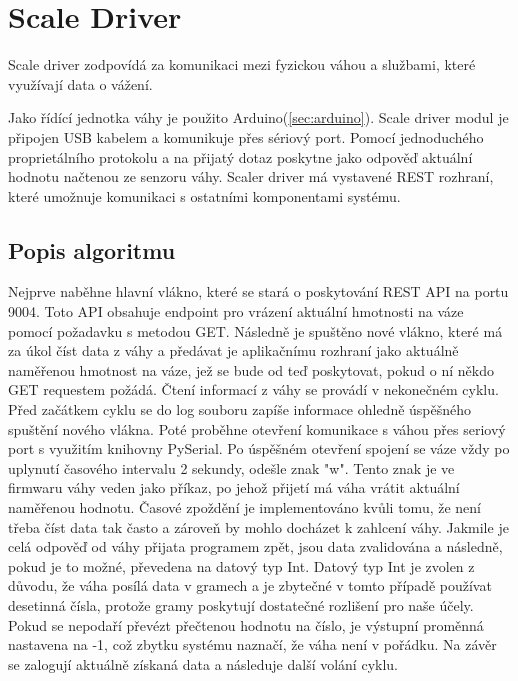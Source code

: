 \section{Scale Driver}\label{sec:scale-driver}
Scale driver zodpovídá za komunikaci mezi fyzickou váhou a službami, které využívají data o vážení.\newline

Jako řídící jednotka váhy je použito Arduino(\ref{sec:arduino}).
Scale driver modul je připojen USB kabelem a komunikuje přes sériový port.
Pomocí jednoduchého proprietálního protokolu a na přijatý dotaz poskytne jako odpověď aktuální hodnotu načtenou ze senzoru váhy.
Scaler driver má vystavené REST rozhraní, které umožnuje komunikaci s ostatními komponentami systému.

\subsection*{Popis algoritmu}
Nejprve naběhne hlavní vlákno, které se stará o poskytování REST API na portu 9004.
Toto API obsahuje endpoint pro vrázení aktuální hmotnosti na váze pomocí požadavku s metodou GET.
Následně je spuštěno nové vlákno, které má za úkol číst data z váhy a předávat je aplikačnímu rozhraní jako aktuálně naměřenou hmotnost na váze, jež se bude od teď poskytovat, pokud o ní někdo GET requestem požádá.
Čtení informací z váhy se provádí v nekonečném cyklu.
Před začátkem cyklu se do log souboru zapíše informace ohledně úspěšného spuštění nového vlákna.
Poté proběhne otevření komunikace s váhou přes seriový port s využitím knihovny PySerial.
Po úspěšném otevření spojení se váze vždy po uplynutí časového intervalu 2 sekundy, odešle znak "w".
Tento znak je ve firmwaru váhy veden jako příkaz, po jehož přijetí má váha vrátit aktuální naměřenou hodnotu.
Časové zpoždění je implementováno kvůli tomu, že není třeba číst data tak často a zároveň by mohlo docházet k zahlcení váhy.
Jakmile je celá odpověď od váhy přijata programem zpět, jsou data zvalidována a následně, pokud je to možné, převedena na datový typ Int.
Datový typ Int je zvolen z důvodu, že váha posílá data v gramech a je zbytečné v tomto případě používat desetinná čísla, protože gramy poskytují dostatečné rozlišení pro naše účely.
Pokud se nepodaří převézt přečtenou hodnotu na číslo, je výstupní proměnná nastavena na -1, což zbytku systému naznačí, že váha není v pořádku.
Na závěr se zalogují aktuálně získaná data a následuje další volání cyklu.


